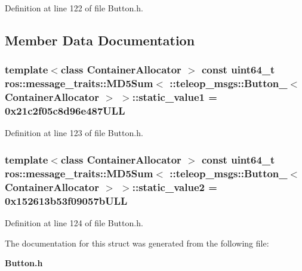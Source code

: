 Definition at line 122 of file Button.h.



\subsection{Member Data Documentation}
\subsubsection[{static\_\-value1}]{\setlength{\rightskip}{0pt plus 5cm}template$<$class ContainerAllocator $>$ const uint64\_\-t ros::message\_\-traits::MD5Sum$<$ ::{\bf teleop\_\-msgs::Button\_\-}$<$ ContainerAllocator $>$ $>$::{\bf static\_\-value1} = 0x21c2f05c8d96e487ULL\hspace{0.3cm}{\ttfamily  [static]}}\label{structros_1_1message__traits_1_1MD5Sum_3_01_1_1teleop__msgs_1_1Button___3_01ContainerAllocator_01_4_01_4_a57b83abc070f26399721199c879a7a6a}


Definition at line 123 of file Button.h.

\subsubsection[{static\_\-value2}]{\setlength{\rightskip}{0pt plus 5cm}template$<$class ContainerAllocator $>$ const uint64\_\-t ros::message\_\-traits::MD5Sum$<$ ::{\bf teleop\_\-msgs::Button\_\-}$<$ ContainerAllocator $>$ $>$::{\bf static\_\-value2} = 0x152613b53f09057bULL\hspace{0.3cm}{\ttfamily  [static]}}\label{structros_1_1message__traits_1_1MD5Sum_3_01_1_1teleop__msgs_1_1Button___3_01ContainerAllocator_01_4_01_4_ab711075d727a088d4108e601b46e0a09}


Definition at line 124 of file Button.h.



The documentation for this struct was generated from the following file:\begin{DoxyCompactItemize}
\item 
{\bf Button.h}\end{DoxyCompactItemize}
